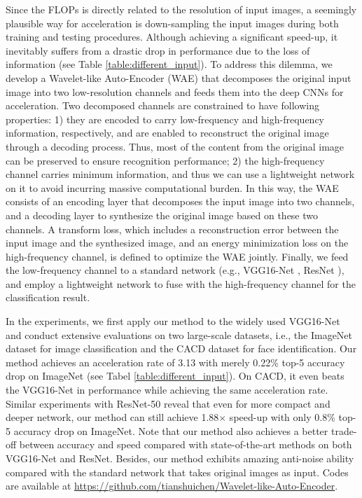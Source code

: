 \documentclass[letterpaper]{article} %
\begin{document}
Since the FLOPs is directly related to the resolution of input images, a seemingly plausible way for acceleration is down-sampling the input images during both training and testing procedures. Although achieving a significant speed-up, it inevitably suffers from a drastic drop in performance due to the loss of information (see Table \ref{table:different_input}). To address this dilemma, we develop a Wavelet-like Auto-Encoder (WAE) that decomposes the original input image into two low-resolution channels and feeds them into the deep CNNs for acceleration. Two decomposed channels are constrained to have following properties: 1) they are encoded to carry low-frequency and high-frequency information, respectively, and are enabled to reconstruct the original image through a decoding process. Thus, most of the content from the original image can be preserved to ensure recognition performance; 2) the high-frequency channel carries minimum information, and thus we can use a lightweight network on it to avoid incurring massive computational burden. In this way, the WAE consists of an encoding layer that decomposes the input image into two channels, and a decoding layer to synthesize the original image based on these two channels. A transform loss, which includes a reconstruction error between the input image and the synthesized image, and an energy minimization loss on the high-frequency channel, is defined to optimize the WAE jointly. Finally, we feed the low-frequency channel to a standard network (e.g., VGG16-Net \cite{simonyan2014very}, ResNet \cite{he2016deep}), and employ a lightweight network to fuse with the high-frequency channel for the classification result.

In the experiments, we first apply our method to the widely used VGG16-Net and conduct extensive evaluations on two large-scale datasets, i.e., the ImageNet dataset for image classification and the CACD dataset for face identification. Our method achieves an acceleration rate of 3.13 with merely 0.22\% top-5 accuracy drop on ImageNet (see Tabel \ref{table:different_input}). On CACD, it even beats the VGG16-Net in performance while achieving the same acceleration rate. Similar experiments with ResNet-50 reveal that even for more compact and deeper network, our method can still achieve 1.88$\times$ speed-up with only 0.8\% top-5 accuracy drop on ImageNet. Note that our method also achieves a better trade-off between accuracy and speed compared with state-of-the-art methods on both VGG16-Net and ResNet. Besides, our method exhibits amazing anti-noise ability compared with the standard network that takes original images as input. Codes are available at \url{https://github.com/tianshuichen/Wavelet-like-Auto-Encoder}.
\end{document}
